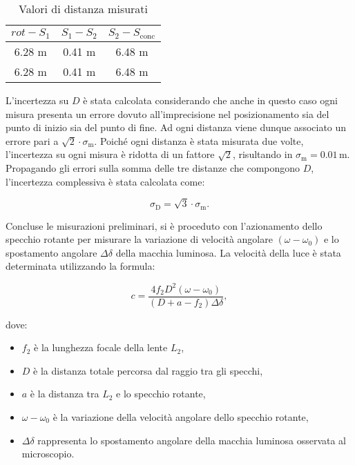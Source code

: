 \documentclass{article}
\begin{document}
\begin{table}[h]
    \centering
    \begin{tabular}{|c|c|c|}
        \hline
        \textbf{\(rot-S_1\)} & \textbf{\(S_1-S_2\)} & \textbf{\(S_2-S_\text{conc}\)} \\ \hline
        6.28 m        & 0.41 m          & 6.48   m              \\ \hline
        6.28  m         & 0.41 m          & 6.48  m      \\ \hline
    \end{tabular}
    \caption{Valori di distanza misurati}
    \label{tab:table1}
\end{table}

L'incertezza su $D$ è stata calcolata considerando che anche in questo caso ogni misura presenta un errore dovuto all'imprecisione nel posizionamento sia del punto di inizio sia del punto di fine.  Ad ogni distanza viene dunque associato un errore pari a \(\sqrt{2}\cdot\sigma_\text{m}\). Poiché ogni distanza è stata misurata due volte, l'incertezza su ogni misura è ridotta di un fattore $\sqrt{2}$, risultando in \(\sigma_\text{m} = 0.01 \, \text{m}\). Propagando gli errori sulla somma delle tre distanze che compongono $D$, l'incertezza complessiva è stata calcolata come:

\begin{equation}
\sigma_\text{D} = \sqrt{3}  \cdot \sigma_\text{m}.
\end{equation}

Concluse le misurazioni preliminari, si è proceduto con l'azionamento dello specchio rotante per misurare la variazione di velocità angolare $(\omega - \omega_0)$ e lo spostamento angolare $\Delta \delta$ della macchia luminosa. La velocità della luce è stata determinata utilizzando la formula:

\begin{equation}
c = \frac{4 f_2 D^2 (\omega - \omega_0)}{(D + a - f_2) \Delta \delta},
\end{equation}

dove:
\begin{itemize}
    \item $f_2$ è la lunghezza focale della lente \(L_2\),
    \item $D$ è la distanza totale percorsa dal raggio tra gli specchi,
    \item $a$ è la distanza tra \(L_2\) e lo specchio rotante,
    \item  \(\omega - \omega_0\) è la variazione della velocità angolare dello specchio rotante,
    \item $\Delta \delta$ rappresenta lo spostamento angolare della macchia luminosa osservata al microscopio.
\end{itemize}
\end{document}
